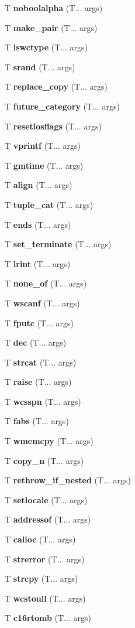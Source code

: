 \begin{DoxyCompactItemize}
\item 
T \textbf{ noboolalpha} (T... args)
\item 
T \textbf{ make\+\_\+pair} (T... args)
\item 
T \textbf{ iswctype} (T... args)
\item 
T \textbf{ srand} (T... args)
\item 
T \textbf{ replace\+\_\+copy} (T... args)
\item 
T \textbf{ future\+\_\+category} (T... args)
\item 
T \textbf{ resetiosflags} (T... args)
\item 
T \textbf{ vprintf} (T... args)
\item 
T \textbf{ gmtime} (T... args)
\item 
T \textbf{ align} (T... args)
\item 
T \textbf{ tuple\+\_\+cat} (T... args)
\item 
T \textbf{ ends} (T... args)
\item 
T \textbf{ set\+\_\+terminate} (T... args)
\item 
T \textbf{ lrint} (T... args)
\item 
T \textbf{ none\+\_\+of} (T... args)
\item 
T \textbf{ wscanf} (T... args)
\item 
T \textbf{ fputc} (T... args)
\item 
T \textbf{ dec} (T... args)
\item 
T \textbf{ strcat} (T... args)
\item 
T \textbf{ raise} (T... args)
\item 
T \textbf{ wcsspn} (T... args)
\item 
T \textbf{ fabs} (T... args)
\item 
T \textbf{ wmemcpy} (T... args)
\item 
T \textbf{ copy\+\_\+n} (T... args)
\item 
T \textbf{ rethrow\+\_\+if\+\_\+nested} (T... args)
\item 
T \textbf{ setlocale} (T... args)
\item 
T \textbf{ addressof} (T... args)
\item 
T \textbf{ calloc} (T... args)
\item 
T \textbf{ strerror} (T... args)
\item 
T \textbf{ strcpy} (T... args)
\item 
T \textbf{ wcstoull} (T... args)
\item 
T \textbf{ c16rtomb} (T... args)
\item 

\end{DoxyCompactItemize}
